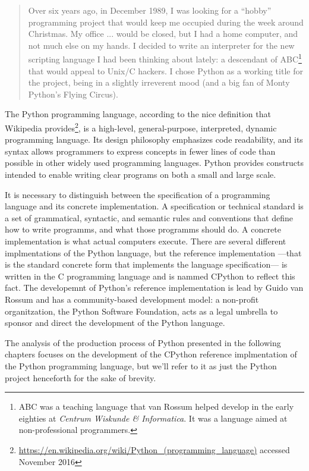 \begin{quote}
Over six years ago, in December 1989, I was looking for a ``hobby'' programming project that would keep me occupied during the week around Christmas. My office ... would be closed, but I had a home computer, and not much else on my hands. I decided to write an interpreter for the new scripting language I had been thinking about lately: a descendant of ABC\footnote{ABC was a teaching language that van Rossum helped develop in the early eighties at \emph{Centrum   Wiskunde \& Informatica}. It was a language aimed at non-professional programmers.} that would appeal to Unix/C hackers. I chose Python as a working title for the project, being in a slightly irreverent mood (and a big fan of Monty Python's Flying Circus).
\end{quote}

The Python programming language, according to the nice definition that Wikipedia provides\footnote{\href{https://en.wikipedia.org/wiki/Python_(programming_language)}{https://en.wikipedia.org/wiki/Python\_(programming\_language)} accessed November 2016}, is a high-level, general-purpose, interpreted, dynamic programming language. Its design philosophy emphasizes code readability, and its syntax allows programmers to express concepts in fewer lines of code than possible in other widely used programming languages. Python provides constructs intended to enable writing clear programs on both a small and large scale.

It is necessary to distinguish between the specification of a programming language and its concrete implementation. A specification or technical standard is a set of grammatical, syntactic, and semantic rules and conventions that define how to write programms, and what those programms should do. A concrete implementation is what actual computers execute. There are several different implmentations of the Python language, but the reference implementation ---that is the standard concrete form that implements the language specification--- is written in the C programming language and is nammed CPython to reflect this fact. The developemnt of Python's reference implementation is lead by Guido van Rossum and has a community-based development model: a non-profit organitzation, the Python Software Foundation, acts as a legal umbrella to sponsor and direct the development of the Python language.

The analysis of the production process of Python presented in the following chapters focuses on the development of the CPython reference implmentation of the Python programming language, but we'll refer to it as just the Python project henceforth for the sake of brevity.    

